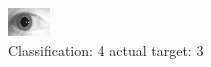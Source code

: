 \begin{figure}[h!]
\begin{center}
\includegraphics[width=0.60\columnwidth]{figures/ID1833_class_4_target_3.png}
\end{center}
\caption{ Classification: 4 actual target: 3}
\label{fig:ID1833_class_4_target_3}
\end{figure}
